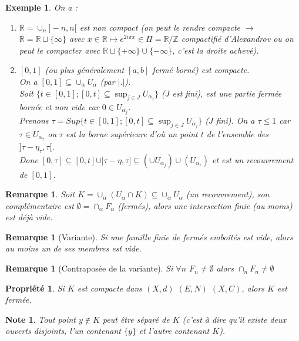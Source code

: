 \documentclass[a4paper, oneside]{report}
\theoremstyle{break}
\newtheorem{propr}[thm]{Propriété}
\newtheorem{exem}[thm]{Exemple}
\newtheorem{remar}[thm]{Remarque}
\newtheorem{note}[thm]{Note}
\newcommand{\R}{\mathbb{R}}
\newcommand{\Z}{\mathbb{Z}}
\begin{document}
\begin{exem}
On a :
\begin{enumerate}
\item $\R = \cup_n ]-n,n[$ est non compact (on peut le rendre compacte $\rightarrow$ $\bar{\R}=\R\sqcup \{\infty\}$ avec $x\in\R\mapsto e^{2i\pi x}\in \Pi=\R/\Z$ compactifié d'Alexandrov ou on peut le compacter avec $\R \sqcup \{+\infty\} \cup \{-\infty\}$, c'est la droite achevé).\\
\item $[0,1]$ (ou plus généralement $[a,b]$ fermé borné) est compacte.\\
On a $[0,1]\subseteq \cup_\alpha U_\alpha$ (par $|.|$).\\
Soit $\{t \in [0,1]; [0,t]\subseteq \sup_{j\in J}U_{\alpha_j} \}$ ($J$ est fini), est une partie fermée bornée et non vide car $0\in U_{\alpha_j}$.\\
Prenons $\tau=Sup\{t\in [0,1]; [0,t]\subseteq  \sup_{j\in J}U_{\alpha_j} \}$ ($J$ fini). On a $\tau \leq 1$ car $\tau \in U_{\alpha_\tau}$ ou $\tau$ est la borne supérieure d'où un point $t$ de l'ensemble des $]\tau - \eta_\tau, \tau[$.\\
Donc $[0,\tau]\subseteq [0,t]\cup ]\tau - \eta, \tau] \subseteq (\cup U_{\alpha_j}) \cup (U_{\alpha_\tau})$ et est un recouvrement de $[0,1]$.
\end{enumerate}
\end{exem}


\begin{remar}
Soit $K = \cup_\alpha (U_\alpha \cap K) \subseteq \cup_\alpha U_\alpha$ (un recouvrement), son complémentaire est $\emptyset = \cap_\alpha F_\alpha$ (fermés), alors une intersection finie (au moins) est déjà vide.
\end{remar}

\begin{remar}[Variante]
Si une famille finie de fermés emboîtés est vide, alors au moins un de ses membres est vide.
\end{remar}

\begin{remar}[Contraposée de la variante]
Si $\forall n$ $F_n\neq \emptyset$ alors $\cap_n F_n \neq \emptyset$
\end{remar}


\begin{propr}
\label{prop_1_b}
Si $K$ est compacte dans $(X,d)$ $(E,N)$ $(X,C)$, alors $K$ est fermée.
\end{propr}


\begin{note}
Tout point $y \notin K$ peut être séparé de $K$ (c'est à dire qu'il existe deux ouverts disjoints, l'un contenant $\{y\}$ et l'autre contenant $K$).
\end{note}
\end{document}
